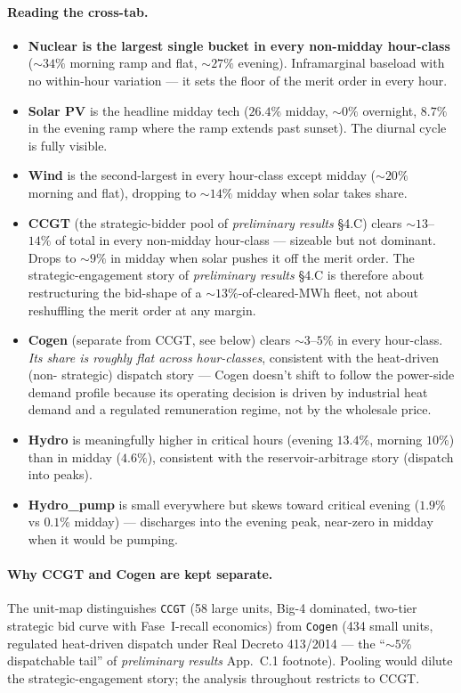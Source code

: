 \documentclass[11pt,a4paper]{article}
\begin{document}
\paragraph{Reading the cross-tab.}
\begin{itemize}\setlength{\itemsep}{2pt}
\item \textbf{Nuclear is the largest single bucket in every
non-midday hour-class} ($\sim\!34\%$ morning ramp and flat,
$\sim\!27\%$ evening). Inframarginal baseload with no within-hour
variation --- it sets the floor of the merit order in every hour.
\item \textbf{Solar PV} is the headline midday tech ($26.4\%$
midday, $\sim\!0\%$ overnight, $8.7\%$ in the evening ramp where the
ramp extends past sunset). The diurnal cycle is fully visible.
\item \textbf{Wind} is the second-largest in every hour-class except
midday ($\sim\!20\%$ morning and flat), dropping to $\sim\!14\%$
midday when solar takes share.
\item \textbf{CCGT} (the strategic-bidder pool of
\emph{preliminary results} \S 4.C) clears $\sim\!13$--$14\%$ of
total in every non-midday hour-class --- sizeable but not dominant.
Drops to $\sim\!9\%$ in midday when solar pushes it off the merit
order. The strategic-engagement story of \emph{preliminary results}
\S 4.C is therefore about restructuring the bid-shape of a
$\sim\!13\%$-of-cleared-MWh fleet, not about reshuffling the merit
order at any margin.
\item \textbf{Cogen} (separate from CCGT, see below) clears
$\sim\!3$--$5\%$ in every hour-class. \emph{Its share is roughly
flat across hour-classes}, consistent with the heat-driven (non-
strategic) dispatch story --- Cogen doesn't shift to follow the
power-side demand profile because its operating decision is driven
by industrial heat demand and a regulated remuneration regime, not
by the wholesale price.
\item \textbf{Hydro} is meaningfully higher in critical hours
(evening $13.4\%$, morning $10\%$) than in midday ($4.6\%$),
consistent with the reservoir-arbitrage story (dispatch into peaks).
\item \textbf{Hydro\_pump} is small everywhere but skews toward
critical evening ($1.9\%$ vs $0.1\%$ midday) --- discharges into the
evening peak, near-zero in midday when it would be pumping.
\end{itemize}

\paragraph{Why CCGT and Cogen are kept separate.} The unit-map distinguishes \texttt{CCGT} (58 large units, Big-4 dominated, two-tier strategic bid curve with Fase~I-recall economics) from \texttt{Cogen} (434 small units, regulated heat-driven dispatch under Real Decreto 413/2014 --- the ``$\sim\!5\%$ dispatchable tail'' of \emph{preliminary results} App.~C.1 footnote). Pooling would dilute the strategic-engagement story; the analysis throughout restricts to CCGT.
\end{document}
